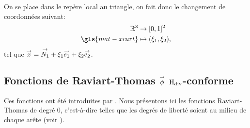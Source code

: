   \FloatBarrier

  On se place dans le repère local au triangle, on fait donc le changement de coordonnées suivant:
  \begin{align*}
    \RR^3 &\rightarrow [0,1]^2 \\
   \gls{mat-xcart} & \mapsto (\xi_1,\xi_2),
  \end{align*}
    tel que \({\overset{\rightarrow}{x}} ={\overset{\rightarrow}{N_1}}+ \xi_1 {\overset{\rightarrow}{e_1}} + \xi_2 {\overset{\rightarrow}{e_2}}\).

  \subsection[Fonctions de Raviart-Thomas phi Hdiv-conforme]{Fonctions de Raviart-Thomas \({\overset{\rightarrow}{\phi}}\) \(\mathrm{H}_\mathrm{div}\)-conforme}

    Ces fonctions ont été introduites par \cite{raviart_mixed_1977}.
    Nous présentons ici les fonctions Raviart-Thomas de degré 0, c'est-à-dire telles que les degrés de liberté soient au milieu de chaque arête (voir \cite[eq.~(3.10)]{raviart_mixed_1977}).

